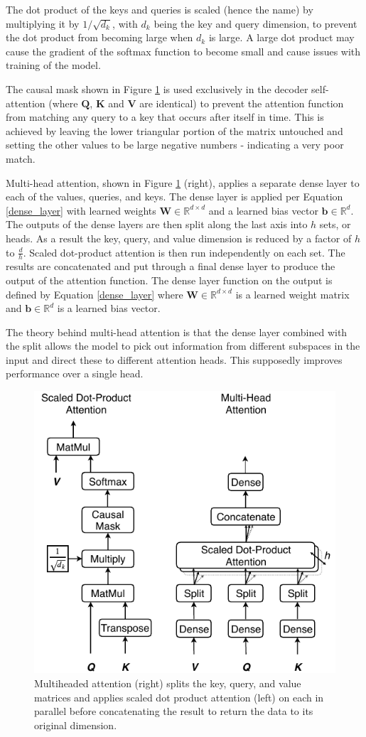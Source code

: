 \documentclass[conference]{IEEEtran}
\begin{document}
The dot product of the keys and queries is scaled (hence the name) by multiplying it by $1 / \sqrt{d_k}$, with $d_k$ being the key and query dimension, to prevent the dot product from becoming large when $d_k$ is large.
A large dot product may cause the gradient of the softmax function to become small and cause issues with training of the model.

The causal mask shown in Figure \ref{fig:multihead} is used exclusively in the decoder self-attention (where $\boldsymbol{Q}$, $\boldsymbol{K}$ and $\boldsymbol{V}$ are identical) to prevent the attention function from matching any query to a key that occurs after itself in time.
This is achieved by leaving the lower triangular portion of the matrix untouched and setting the other values to be large negative numbers - indicating a very poor match.

Multi-head attention, shown in Figure \ref{fig:multihead} (right), applies a separate dense layer to each of the values, queries, and keys. 
The dense layer is applied per Equation \ref{dense_layer} with learned weights $\boldsymbol{W} \in \mathbb{R}^{d \times d}$ and a learned bias vector $\boldsymbol{b} \in \mathbb{R}^{d}$.
The outputs of the dense layers are then split along the last axis into $h$ sets, or heads.
As a result the key, query, and value dimension is reduced by a factor of $h$ to $\frac{d}{h}$.
Scaled dot-product attention is then run independently on each set.
The results are concatenated and put through a final dense layer to produce the output of the attention function.
The dense layer function on the output is defined by Equation \ref{dense_layer} where $\boldsymbol{W} \in \mathbb{R}^{d \times d}$ is a learned weight matrix and $\boldsymbol{b} \in \mathbb{R}^{d}$ is a learned bias vector.

The theory behind multi-head attention is that the dense layer combined with the split allows the model to pick out information from different subspaces in the input and direct these to different attention heads.
This supposedly improves performance over a single head.

\begin{figure}[htbp]
	\centerline{\includegraphics[width=.35\textwidth]{images/multihead_attn.pdf}}
	\caption{Multiheaded attention (right) splits the key, query, and value matrices and applies scaled dot product attention (left) on each in parallel before concatenating the result to return the data to its original dimension.}
	\label{fig:multihead}
\end{figure}
\end{document}
